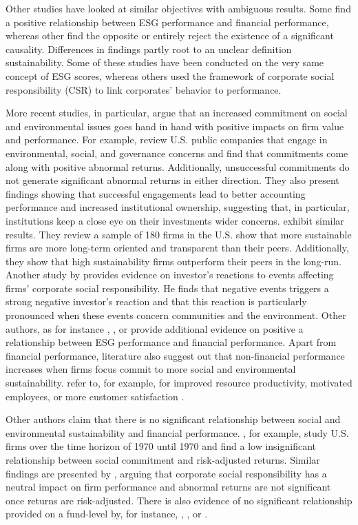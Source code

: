 \documentclass[11pt]{article}
\begin{document}
Other studies have looked at similar objectives with ambiguous results. Some find a positive relationship between ESG performance and financial performance, whereas other find the opposite or entirely reject the existence of a significant causality. Differences in findings partly root to an unclear definition sustainability. Some of these studies have been conducted on the very same concept of ESG scores, whereas others used the framework of corporate social responsibility (CSR) to link corporates' behavior to performance.

More recent studies, in particular, argue that an increased commitment on social and environmental issues goes hand in hand with positive impacts on firm value and performance. For example, \citet{Dimson2015} review U.S. public companies that engage in environmental, social, and governance concerns and find that commitments come along with positive abnormal returns. Additionally, unsuccessful commitments do not generate significant abnormal returns in either direction. They also present findings showing that successful engagements lead to better accounting performance and increased institutional ownership, suggesting that, in particular, institutions keep a close eye on their investments wider concerns. \citet{Eccles2014} exhibit similar results. They review a sample of 180 firms in the U.S. show that more sustainable firms are more long-term oriented and transparent than their peers. Additionally, they show that high sustainability firms outperform their peers in the long-run. Another study by \citet{Kruger2015} provides evidence on investor’s reactions to events affecting firms’ corporate social responsibility. He finds that negative events triggers a strong negative investor’s reaction and that this reaction is particularly pronounced when these events concern communities and the environment. Other authors, as for instance \citet{Ge2015}, \citet{Fatemi2015}, or \citet{Porter2006} provide additional evidence on positive a relationship between ESG performance and financial performance. Apart from financial performance, literature also suggest out that non-financial performance increases when firms focus commit to more social and environmental sustainability. \citet{Porter1995, Greening2000, Xie2014} refer to, for example, for improved resource productivity, motivated employees, or more customer satisfaction \citep[as cited in][]{Fatemi2018}.
 


Other authors claim that there is no significant relationship between social and environmental sustainability and financial performance. \citet{Alexander1978}, for example, study U.S. firms over the time horizon of 1970 until 1970 and find a low insignificant relationship between social commitment and risk-adjusted returns. Similar findings are presented by \citet{Siegel2000}, arguing that corporate social responsibility has a neutral impact on firm performance and abnormal returns are not significant once returns are risk-adjusted. There is also evidence of no significant relationship provided on a fund-level by, for instance, \citet{Renneboog2008}, \citet{Bauer2005}, or \citet{Hamilton1993}. 
\end{document}

